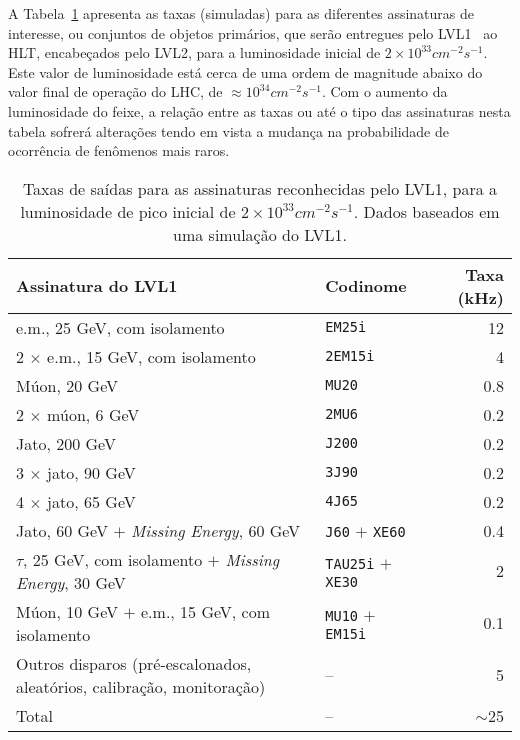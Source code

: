 A Tabela~\ref{tab:l1-rates} apresenta as taxas (simuladas) para as diferentes
assinaturas de interesse, ou conjuntos de objetos primários, que serão
entregues pelo LVL1~\cite{hlt-tdr} ao HLT, encabeçados pelo LVL2, para a
luminosidade inicial de $2\times10^{33}cm^{-2}s^{-1}$. Este valor de
luminosidade está cerca de uma ordem de magnitude abaixo do valor final de
operação do LHC, de $\approx 10^{34}cm^{-2}s^{-1}$. Com o aumento da
luminosidade do feixe, a relação entre as taxas ou até o tipo das assinaturas
nesta tabela sofrerá alterações tendo em vista a mudança na probabilidade de
ocorrência de fenômenos mais raros.

\begin{table}
\begin{center}
\begin{sideways}
\begin{tabular}{|l|l|r|}
\hline
\textbf{Assinatura do LVL1} & \textbf{Codinome} & \textbf{Taxa (kHz)} \\ \hline
e.m., 25 GeV, com isolamento & \texttt{EM25i} & 12 \\ \hline
2 $\times$ e.m., 15 GeV, com isolamento & \texttt{2EM15i} & 4 \\ \hline
Múon, 20 GeV & \texttt{MU20} & 0.8 \\ \hline
2 $\times$ múon, 6 GeV & \texttt{2MU6} & 0.2 \\ \hline
Jato, 200 GeV & \texttt{J200} & 0.2 \\ \hline
3 $\times$ jato, 90 GeV & \texttt{3J90} & 0.2 \\ \hline
4 $\times$ jato, 65 GeV & \texttt{4J65} & 0.2 \\ \hline
Jato, 60 GeV $+$ \textit{Missing Energy}, 60 GeV & \texttt{J60} $+$
\texttt{XE60} & 0.4 \\ \hline
$\tau$, 25 GeV, com isolamento $+$ \textit{Missing Energy}, 30 GeV &
\texttt{TAU25i} $+$ \texttt{XE30} & 2 \\
\hline
Múon, 10 GeV $+$ e.m., 15 GeV, com isolamento & \texttt{MU10} $+$ \texttt{EM15i} & 0.1 \\ \hline
Outros disparos (pré-escalonados, aleatórios, calibração, monitoração) & -- & 5 \\
\hline
Total & -- & $\sim$25 \\ \hline
\end{tabular}
\end{sideways}
\end{center}
\caption{Taxas de saídas para as assinaturas reconhecidas pelo LVL1,
para a luminosidade de pico inicial de $2\times10^{33}cm^{-2}s^{-1}$. Dados
baseados em uma simulação do LVL1.}
\label{tab:l1-rates}
\end{table}

